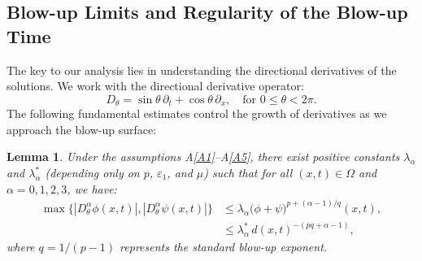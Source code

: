\documentclass[
  sn-mathphys-num,
  colorlinks,
  linkcolor=darkmagenta,
  citecolor=rufous,
  urlcolor=zaffre,
  hypertexnames=false
]{sn-jnl}
\numberwithin{equation}{section}
\newtheorem{lemma}[theorem]{Lemma}%
\begin{document}
\subsection{Blow-up Limits and Regularity of the Blow-up Time}\label{sec6}
The key to our analysis lies in understanding the directional derivatives of the solutions. We work with the directional derivative operator:
$$
D_\theta = \sin\theta\,\partial_t + \cos\theta\,\partial_x, \quad \text{for } 0 \leq \theta < 2\pi.
$$
The following fundamental estimates control the growth of derivatives as we approach the blow-up surface:

\begin{lemma}\label{lem:4.1}
Under the assumptions A\ref{A1}--A\ref{A5}, there exist positive constants $\lambda_\alpha$ and $\lambda_\alpha^{*}$ (depending only on $p$, $\varepsilon_1$, and $\mu$) such that for all $(x,t) \in \Omega$ and $\alpha = 0,1,2,3$, we have:
\begin{equation}\label{eq:4.1}
\begin{aligned}
\max\bigl\{|D_\theta^{\alpha}\phi(x,t)|, |D_\theta^{\alpha}\psi(x,t)|\bigr\}
  &\leq \lambda_\alpha\bigl(\phi+\psi\bigr)^{p+(\alpha-1)/q}(x,t),  \\
  &\leq \lambda_\alpha^{*}\,d(x,t)^{-(pq+\alpha-1)},
\end{aligned}
\end{equation}
where $q=1/(p-1)$ represents the standard blow-up exponent.
\end{lemma}
\end{document}

